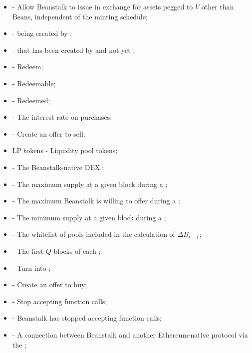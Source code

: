 \documentclass[class=article, crop=false]{standalone}
\begin{document}
\begin{itemize}[topsep=0pt, itemsep=3pt,leftmargin=16pt]
    \item[]  - \hypertarget{ht93}{Allow Beanstalk to issue  in exchange for assets pegged to $V$ other than Beans, independent of the  minting schedule};
    \item[]  - \hypertarget{ht102}{ being created by };
    \item[]  - \hypertarget{ht103}{ that has been created by  and not yet };
    \item[]  - \hypertarget{ht112}{Redeem};
    \item[]  - \hypertarget{ht113}{Redeemable};
    \item[]  - \hypertarget{ht114}{Redeemed};
    \item[]  - \hypertarget{ht115}{The interest rate on  purchases};
    \item[]  - \hypertarget{ht124}{Create an offer to sell};
    \item[] LP tokens - \hypertarget{ht125}{Liquidity pool tokens};
    \item[]  - \hypertarget{ht130}{The Beanstalk-native DEX.};
    \item[]  - The maximum  supply at a given block during a ;
    \item[]  - The maximum  Beanstalk is willing to offer during a ;
    \item[]  - The minimum  supply at a given block during a ;
    \item[]  - \hypertarget{ht133}{The whitelist of pools included in the calculation of $\Delta B_{\overline{t-1}}$};
    \item[]  - The first $Q$ blocks of each ;
    \item[]  - \hypertarget{ht131}{Turn  into };
    \item[]  - \hypertarget{ht134}{Create an offer to buy};
    \item[]  - \hypertarget{ht144}{Stop accepting  function calls};
    \item[]  - \hypertarget{ht145}{Beanstalk has stopped accepting  function calls};
    \item[]  - \hypertarget{ht146}{A connection between Beanstalk and another Ethereum-native protocol via the };

\end{itemize}
\end{document}
